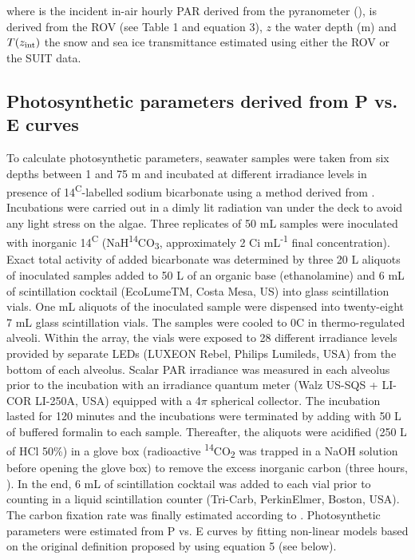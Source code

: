 \noindent where \eparzeroscalar{} is the incident in-air hourly PAR derived from the pyranometer (\micromol{}), \kdparscalar{} is derived from the ROV (see Table 1 and equation 3), $z$ the water depth (m) and $T(z_{\textnormal{int}})$ the snow and sea ice transmittance estimated using either the ROV or the SUIT data.

\subsection{Photosynthetic parameters derived from P vs. E curves}

To calculate photosynthetic parameters, seawater samples were taken from six depths between 1 and 75 m and incubated at different irradiance levels in presence of 14\textsuperscript{C}-labelled sodium bicarbonate using a method derived from \citet{Lewis1983}. Incubations were carried out in a dimly lit radiation van under the deck to avoid any light stress on the algae. Three replicates of 50 mL samples were inoculated with inorganic 14\textsuperscript{C} (NaH\textsuperscript{14}CO\textsubscript{3}, approximately 2 \textmu Ci mL\textsuperscript{-1} final concentration). Exact total activity of added bicarbonate was determined by three 20 \textmu L aliquots of inoculated samples added to 50 \textmu L of an organic base (ethanolamine) and 6 mL of scintillation cocktail (EcoLumeTM, Costa Mesa, US) into glass scintillation vials. One mL aliquots of the inoculated sample were dispensed into twenty-eight 7 mL glass scintillation vials. The samples were cooled to 0\textdegree{}C in thermo-regulated alveoli. Within the array, the vials were exposed to 28 different irradiance levels provided by separate LEDs (LUXEON Rebel, Philips Lumileds, USA) from the bottom of each alveolus. Scalar PAR irradiance was measured in each alveolus prior to the incubation with an irradiance quantum meter (Walz US-SQS + LI-COR LI-250A, USA) equipped with a 4$\pi$ spherical collector. The incubation lasted for 120 minutes and the incubations were terminated by adding with 50 \textmu L of buffered formalin to each sample. Thereafter, the aliquots were acidified (250 \textmu L of HCl 50\%) in a glove box (radioactive \textsuperscript{14}CO\textsubscript{2} was trapped in a NaOH solution before opening the glove box) to remove the excess inorganic carbon (three hours, \citet{Knap1996}). In the end, 6 mL of scintillation cocktail was added to each vial prior to counting in a liquid scintillation counter (Tri-Carb, PerkinElmer, Boston, USA). The carbon fixation rate was finally estimated according to \citet{Parsons1984}. Photosynthetic parameters were estimated from P vs. E curves by fitting non-linear models based on the original definition proposed by \citet{Platt1980} using equation 5 (see below).

